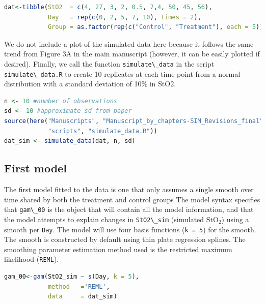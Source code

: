\documentclass[
]{article}
\newcommand{\passthrough}[1]{#1}
\begin{document}
\begin{lstlisting}[language=R]
dat<-tibble(StO2  = c(4, 27, 3, 2, 0.5, 7,4, 50, 45, 56),
            Day   = rep(c(0, 2, 5, 7, 10), times = 2),
            Group = as.factor(rep(c("Control", "Treatment"), each = 5)))
\end{lstlisting}

We do not include a plot of the simulated data here because it follows the same trend from Figure 3A in the main manuscript (however, it can be easily plotted if desired).
Finally, we call the function \passthrough{\lstinline!simulate\_data!} in the script \passthrough{\lstinline!simulate\_data.R!} to create 10 replicates at each time point from a normal distribution with a standard deviation of 10\% in \(\mbox{StO2}\).

\begin{lstlisting}[language=R]
n <- 10 #number of observations
sd <- 10 #approximate sd from paper
source(here("Manuscripts", "Manuscript_by_chapters-SIM_Revisions_final",
            "scripts", "simulate_data.R"))
dat_sim <- simulate_data(dat, n, sd)
\end{lstlisting}

\hypertarget{first-model}{%
\subsection{First model}\label{first-model}}

The first model fitted to the data is one that only assumes a single smooth over time shared by both the treatment and control groups The model syntax specifies that \passthrough{\lstinline!gam\_00!} is the object that will contain all the model information, and that the model attempts to explain changes in \passthrough{\lstinline!StO2\_sim!} (simulated \(\mbox{StO}_2\)) using a smooth per \passthrough{\lstinline!Day!}. The model will use four basis functions (\passthrough{\lstinline!k = 5!}) for the smooth. The smooth is constructed by default using thin plate regression splines. The smoothing parameter estimation method used is the restricted maximum likelihood (\passthrough{\lstinline!REML!}).

\begin{lstlisting}[language=R]
gam_00<-gam(StO2_sim ~ s(Day, k = 5),
            method   ='REML',
            data     = dat_sim)
\end{lstlisting}
\end{document}
